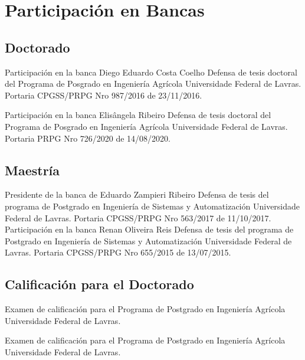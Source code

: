 \documentclass[11pt,a4paper,sans]{moderncv} %
\begin{document}
\section{Participación en Bancas}
\subsection{Doctorado}
			{Participación en la banca Diego Eduardo Costa Coelho}
			{Defensa de tesis doctoral del Programa de Posgrado en Ingeniería Agrícola}{}
			{Universidade Federal de Lavras. Portaria CPGSS/PRPG Nro 987/2016 de 23/11/2016.}

			{Participación en la banca Elisângela Ribeiro}
			{Defensa de tesis doctoral del Programa de Posgrado en Ingeniería Agrícola}{}
			{Universidade Federal de Lavras. Portaria PRPG Nro 726/2020 de 14/08/2020.}


\subsection{Maestría}
			{Presidente de la banca de Eduardo Zampieri Ribeiro}
			{Defensa de tesis del programa de Postgrado en Ingeniería de Sistemas y Automatización}{}
			{Universidade Federal de Lavras. Portaria CPGSS/PRPG Nro 563/2017 de 11/10/2017.}
			{Participación en la banca Renan Oliveira Reis}
			{Defensa de tesis del programa de Postgrado en Ingeniería de Sistemas y Automatización}{}
			{Universidade Federal de Lavras. Portaria CPGSS/PRPG Nro 655/2015 de 13/07/2015.}

\subsection{Calificación para el Doctorado}
			{}
			{Examen de calificación para el Programa de Postgrado en Ingeniería Agrícola}{}
			{Universidade Federal de Lavras.}

			{}
			{Examen de calificación para el Programa de Postgrado en Ingeniería Agrícola}{}
			{Universidade Federal de Lavras.}
\end{document}
